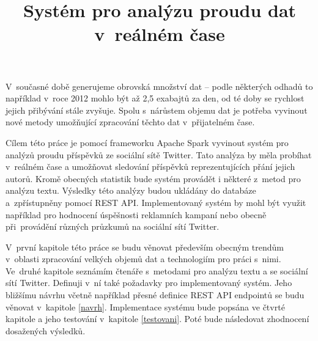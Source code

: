 \documentclass[thesis=B,czech]{FITthesis}[2012/06/26]
\title{Systém pro analýzu proudu dat v~reálném čase}
\begin{document}

\begin{introduction}
	V~současné době generujeme obrovská množství dat -- podle některých odhadů to například v~roce 2012 mohlo být až 2,5 exabajtů za den\cite{bbc-bigdata}, od té doby se rychlost jejich přibývání stále zvyšuje. Spolu s~nárůstem objemu dat je potřeba vyvinout nové metody umožňující zpracování těchto dat v~přijatelném čase. 
	
	Cílem této práce je pomocí frameworku Apache Spark vyvinout systém pro analýzů proudu příspěvků ze sociální sítě Twitter. Tato analýza by měla probíhat v~reálném čase a umožňovat sledování příspěvků reprezentujících přání jejich autorů. Kromě obecných statistik bude systém provádět i některé z~metod pro analýzu textu. Výsledky této analýzy budou ukládány do databáze a~zpřístupněny pomocí REST API. Implementovaný systém by mohl být využit například pro hodnocení úspěšnosti reklamních kampaní nebo obecně při~provádění různých průzkumů na sociální sítí Twitter. 
	
	V~první kapitole této práce se budu věnovat především obecným trendům v~oblasti zpracování velkých objemů dat a technologiím pro práci s~nimi. Ve~druhé kapitole seznámím čtenáře s~metodami pro analýzu textu a se sociální sítí Twitter. Definuji v~ní také požadavky pro implementovaný systém. Jeho bližšímu návrhu včetně například přesné definice REST API endpointů se budu věnovat v~kapitole \ref{navrh}. Implementace systému bude popsána ve čtvrté kapitole a jeho testování v~kapitole \ref{testovani}. Poté bude následovat zhodnocení dosažených výsledků. 
	

	
\end{introduction}

%
\end{document}
